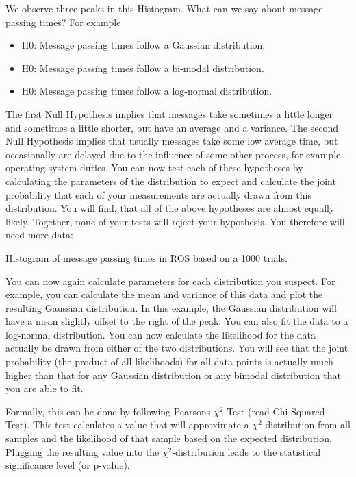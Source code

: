 We observe three peaks in this Histogram. What can we say about message passing times? For example
\begin{itemize}
\item H0: Message passing times follow a Gaussian distribution.
\item H0: Message passing times follow a bi-modal distribution.
\item H0: Message passing times follow a log-normal distribution.
\end{itemize}

The first Null Hypothesis implies that messages take sometimes a little longer and sometimes a little shorter, but have an average and a variance. The second Null Hypothesis implies that usually messages take some low average time, but occasionally are delayed due to the influence of some other process, for example operating system duties. You can now test each of these hypotheses by calculating the parameters of the distribution to expect and calculate the joint probability that each of your measurements are actually drawn from this distribution. You will find, that all of the above hypotheses are almost equally likely. Together, none of your tests will reject your hypothesis. You therefore will need more data:

\begin{framed}
Histogram of message passing times in ROS based on a 1000 trials.
\end{framed}

You can now again calculate parameters for each distribution you suspect. For example, you can calculate the mean and variance of this data and plot the resulting Gaussian distribution. In this example, the Gaussian distribution will have a mean slightly offset to the right of the peak. You can also fit the data to a log-normal distribution. You can now calculate the likelihood for the data actually be drawn from either of the two distributions. You will see that the joint probability (the product of all likelihoods) for all data points is actually much higher than that for any Gaussian distribution or any bimodal distribution that you are able to fit.

Formally, this can be done by following Pearsons $ \chi^2$-Test (read Chi-Squared Test). This test calculates a value that will approximate a $ \chi^2$-distribution from all samples and the likelihood of that sample based on the expected distribution. Plugging the resulting value into the $ \chi^2$-distribution leads to the statistical significance level (or p-value).

